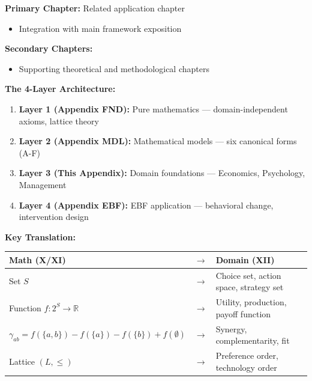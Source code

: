 \begin{tcolorbox}[colback=purple!5!white, colframe=purple!75!black,
    title=Chapter Linkage]

\textbf{Primary Chapter:} Related application chapter
\begin{itemize}[nosep]
\item Integration with main framework exposition
\end{itemize}

\textbf{Secondary Chapters:}
\begin{itemize}[nosep]
\item Supporting theoretical and methodological chapters
\end{itemize}

\end{tcolorbox}

\begin{tcolorbox}[colback=blue!5!white,colframe=blue!75!black,title=\textbf{Quick Reference: Layer 3 Position}]
\textbf{The 4-Layer Architecture:}
\begin{enumerate}[noitemsep]
    \item \textbf{Layer 1 (Appendix FND):} Pure mathematics — domain-independent axioms, lattice theory
    \item \textbf{Layer 2 (Appendix MDL):} Mathematical models — six canonical forms (A-F)
    \item \textbf{Layer 3 (This Appendix):} Domain foundations — Economics, Psychology, Management
    \item \textbf{Layer 4 (Appendix EBF):} EBF application — behavioral change, intervention design
\end{enumerate}

\textbf{Key Translation:}
\begin{center}
\begin{tabular}{lll}
\textbf{Math (X/XI)} & $\rightarrow$ & \textbf{Domain (XII)} \\
\hline
Set $S$ & $\rightarrow$ & Choice set, action space, strategy set \\
Function $f: 2^S \to \mathbb{R}$ & $\rightarrow$ & Utility, production, payoff function \\
$\gamma_{ab} = f(\{a,b\}) - f(\{a\}) - f(\{b\}) + f(\emptyset)$ & $\rightarrow$ & Synergy, complementarity, fit \\
Lattice $(L, \leq)$ & $\rightarrow$ & Preference order, technology order \\
\end{tabular}
\end{center}
\end{tcolorbox}

